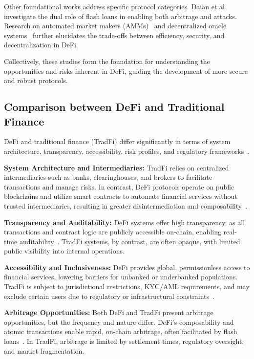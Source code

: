 \documentclass[conference]{IEEEtran}
\begin{document}
Other foundational works address specific protocol categories. Daian et al.~\cite{daian2020flash} investigate the dual role of flash loans in enabling both arbitrage and attacks. Research on automated market makers (AMMs)~\cite{angeris2020improved} and decentralized oracle systems~\cite{zhang2020deoracle} further elucidates the trade-offs between efficiency, security, and decentralization in DeFi.

Collectively, these studies form the foundation for understanding the opportunities and risks inherent in DeFi, guiding the development of more secure and robust protocols.

\subsection{Comparison between DeFi and Traditional Finance}
DeFi and traditional finance (TradFi) differ significantly in terms of system architecture, transparency, accessibility, risk profiles, and regulatory frameworks~\cite{werner2021sok, xu2021sok}.

\textbf{System Architecture and Intermediaries:} TradFi relies on centralized intermediaries such as banks, clearinghouses, and brokers to facilitate transactions and manage risks. In contrast, DeFi protocols operate on public blockchains and utilize smart contracts to automate financial services without trusted intermediaries, resulting in greater disintermediation and composability~\cite{xu2021sok, wood2014ethereum}.

\textbf{Transparency and Auditability:} DeFi systems offer high transparency, as all transactions and contract logic are publicly accessible on-chain, enabling real-time auditability~\cite{werner2021sok}. TradFi systems, by contrast, are often opaque, with limited public visibility into internal operations.

\textbf{Accessibility and Inclusiveness:} DeFi provides global, permissionless access to financial services, lowering barriers for unbanked or underbanked populations. TradFi is subject to jurisdictional restrictions, KYC/AML requirements, and may exclude certain users due to regulatory or infrastructural constraints~\cite{xu2021sok}.

\textbf{Arbitrage Opportunities:} Both DeFi and TradFi present arbitrage opportunities, but the frequency and nature differ. DeFi's composability and atomic transactions enable rapid, on-chain arbitrage, often facilitated by flash loans~\cite{daian2020flash}. In TradFi, arbitrage is limited by settlement times, regulatory oversight, and market fragmentation.
\end{document}
